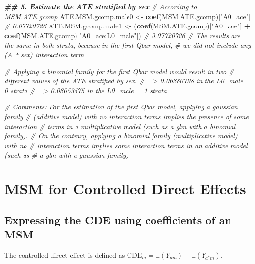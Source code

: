 \documentclass[
]{book}
\newenvironment{Shaded}{\begin{snugshade}}{\end{snugshade}}
\newcommand{\CommentTok}[1]{\textcolor[rgb]{0.56,0.35,0.01}{\textit{#1}}}
\newcommand{\DocumentationTok}[1]{\textcolor[rgb]{0.56,0.35,0.01}{\textbf{\textit{#1}}}}
\newcommand{\FunctionTok}[1]{\textcolor[rgb]{0.13,0.29,0.53}{\textbf{#1}}}
\newcommand{\NormalTok}[1]{#1}
\newcommand{\OtherTok}[1]{\textcolor[rgb]{0.56,0.35,0.01}{#1}}
\newcommand{\SpecialCharTok}[1]{\textcolor[rgb]{0.81,0.36,0.00}{\textbf{#1}}}
\newcommand{\StringTok}[1]{\textcolor[rgb]{0.31,0.60,0.02}{#1}}
\begin{document}
\begin{Shaded}
\begin{Highlighting}[]
\DocumentationTok{\#\# 5. Estimate the ATE stratified by sex}
\CommentTok{\# According to MSM.ATE.gcomp}
\NormalTok{ATE.MSM.gcomp.male0 }\OtherTok{\textless{}{-}} \FunctionTok{coef}\NormalTok{(MSM.ATE.gcomp)[}\StringTok{"A0\_ace"}\NormalTok{]}
\CommentTok{\# 0.07720726}
\NormalTok{ATE.MSM.gcomp.male1 }\OtherTok{\textless{}{-}}\NormalTok{ (}\FunctionTok{coef}\NormalTok{(MSM.ATE.gcomp)[}\StringTok{"A0\_ace"}\NormalTok{] }\SpecialCharTok{+}
                          \FunctionTok{coef}\NormalTok{(MSM.ATE.gcomp)[}\StringTok{"A0\_ace:L0\_male"}\NormalTok{])}
\CommentTok{\# 0.07720726}
\CommentTok{\# The results are the same in both strata, because in the first Qbar model,}
\CommentTok{\# we did not include any (A * sex) interaction term}

\CommentTok{\# Applying a binomial family for the first Qbar model would result in two}
\CommentTok{\# different values of the ATE stratified by sex.}
\CommentTok{\# =\textgreater{} 0.06880798 in the L0\_male = 0 strata}
\CommentTok{\# =\textgreater{} 0.08053575 in the L0\_male = 1 strata}

\CommentTok{\# Comments: For the estimation of the first Qbar model, applying a gaussian family }
\CommentTok{\# (additive model) with no interaction terms implies the presence of some interaction }
\CommentTok{\# terms in a multiplicative model (such as a glm with a binomial family).}
\CommentTok{\# On the contrary, applying a binomial family (multiplicative model) with no}
\CommentTok{\# interaction terms implies some interaction terms in an additive model (such as}
\CommentTok{\# a glm with a gaussian family)}
\end{Highlighting}
\end{Shaded}

\hypertarget{msm_CDE_paragraph}{%
\section{MSM for Controlled Direct Effects}\label{msm_CDE_paragraph}}

\hypertarget{expressing-the-cde-using-coefficients-of-an-msm}{%
\subsection{Expressing the CDE using coefficients of an MSM}\label{expressing-the-cde-using-coefficients-of-an-msm}}

The controlled direct effect is defined as \(\text{CDE}_m= \mathbb{E}(Y_{am}) - \mathbb{E}(Y_{a^*m})\).
\end{document}
